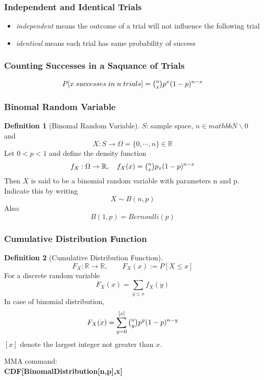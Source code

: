 \documentclass{article}
\theoremstyle{definition}
\newtheorem{definition}{Definition}[subsection]
\begin{document}
\subsubsection{Independent and Identical Trials}
\begin{itemize}
    \item \emph{independent} means the outcome of a trial will not influence the following trial
    \item \emph{identical} means each trial has same probability of success
\end{itemize}
\subsubsection{Counting Successes in a Saquance of Trials}
\begin{equation}
    P[x\;successes\;in\;n\;trials] = \tbinom{n}{x}p^x(1-p)^{n-x}
\end{equation}
\subsubsection{Binomal Random Variable}
\begin{definition}[Binomal Random Variable]
    $S$: sample space, $n \in mathbb{N} \backslash {0} $ and
    \begin{equation}
        X:S\rightarrow \Omega=\{ 0,\dotsm,n \}\in \mathbb{R}
    \end{equation}
    Let $ 0<p<1 $ and define the density function
    \begin{equation}
        f_X:\Omega \rightarrow \mathbb{R},\quad f_X(x)=\tbinom{n}{x}p_x(1-p)^{n-x}
    \end{equation}
    Then $ X $ is said to be a binomial random variable with parameters n and p. Indicate this by writing
    \begin{equation}
        X \sim B(n,p)
    \end{equation}
    Also:
    \begin{equation}
        B(1,p) = Bernoulli(p)
    \end{equation}
\end{definition}
\subsubsection{Cumulative Distribution Function}
\begin{definition}[Cumulative Distribution Function]
    \begin{equation}
        F_X:\mathbb{R}\rightarrow \mathbb{R},\qquad F_X(x):= P[X\leq x]
    \end{equation}
    For a discrete random variable
    \begin{equation}
        F_X(x)=\sum_{y\leq x} f_X(y)
    \end{equation}
    In case of binomial distribution,
    \begin{equation}
        F_X(x) = \sum_{y=0}^{[x]}\tbinom{n}{y}p^y(1-p)^{n-y}
    \end{equation}
    $ [x] $ denote the largest integer not greater than $ x $. 
\end{definition}
MMA command:\\
\textbf{CDF[BinomalDistribution[n,p],x]}
\end{document}

